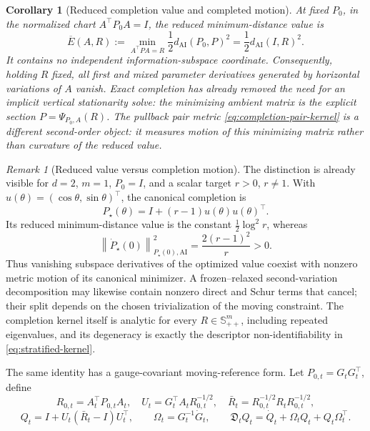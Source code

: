 \documentclass[10pt]{article}
\theoremstyle{plain}
\newtheorem{corollary}[theorem]{Corollary}
\theoremstyle{definition}
\theoremstyle{remark}
\newtheorem{remark}[theorem]{Remark}
\newcommand{\SPD}{\mathbb S_{++}}
\newcommand{\AI}{\mathrm{AI}}
\newcommand{\norm}[1]{\left\lVert #1\right\rVert}
\newcommand{\dai}{d_{\AI}}
\begin{document}
\begin{corollary}[Reduced completion value and completed motion]
\label{cor:reduced-completion-value}
At fixed \(P_0\), in the normalized chart \(A^\top P_0A=I\), the reduced
minimum-distance value is
\begin{equation}
  \overline E(A,R)
  :=\min_{A^\top PA=R}\frac12\dai(P_0,P)^2
  =\frac12\dai(I,R)^2.
  \label{eq:reduced-completion-energy}
\end{equation}
It contains no independent information-subspace coordinate.  Consequently,
holding \(R\) fixed, all first and mixed parameter derivatives generated by
horizontal variations of \(A\) vanish.  Exact completion has already removed
the need for an implicit vertical stationarity solve: the minimizing ambient
matrix is the explicit section \(P=\Psi_{P_0,A}(R)\).  The pullback pair
metric \eqref{eq:completion-pair-kernel} is a different second-order object:
it measures motion of this minimizing matrix rather than curvature of the
reduced value.
\end{corollary}

\begin{remark}[Reduced value versus completion motion]
\label{rem:value-versus-motion}
The distinction is already visible for \(d=2\), \(m=1\), \(P_0=I\), and a
scalar target \(r>0\), \(r\ne1\).  With
\(u(\theta)=(\cos\theta,\sin\theta)^\top\), the canonical completion is
\[
  P_\star(\theta)=I+(r-1)u(\theta)u(\theta)^\top.
\]
Its reduced minimum-distance value is the constant
\(\tfrac12\log^2r\), whereas
\[
  \norm{\dot P_\star(0)}_{P_\star(0),\AI}^2
  =\frac{2(r-1)^2}{r}>0.
\]
Thus vanishing subspace derivatives of the optimized value coexist with
nonzero metric motion of its canonical minimizer.  A frozen--relaxed
second-variation decomposition may likewise contain nonzero direct and
Schur terms that cancel; their split depends on the chosen trivialization of
the moving constraint.  The completion kernel itself is analytic for every
\(R\in\SPD^m\), including repeated eigenvalues, and its degeneracy is exactly
the descriptor non-identifiability in \eqref{eq:stratified-kernel}.
\end{remark}

The same identity has a gauge-covariant moving-reference form.  Let
\(P_{0,t}=G_tG_t^\top\), define
\[
  R_{0,t}=A_t^\top P_{0,t}A_t,
  \quad
  U_t=G_t^\top A_tR_{0,t}^{-1/2},
  \quad
  \bar R_t=R_{0,t}^{-1/2}R_tR_{0,t}^{-1/2},
\]
\[
  Q_t=I+U_t(\bar R_t-I)U_t^\top,
  \qquad
  \Omega_t=G_t^{-1}\dot G_t,
  \qquad
  \mathfrak D_tQ_t=\dot Q_t+\Omega_tQ_t+Q_t\Omega_t^\top.
\]
\end{document}
